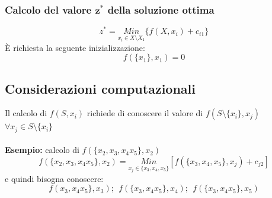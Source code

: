 \subsubsection{Calcolo del valore $\boldsymbol{z^{*}}$ della soluzione ottima}
\begin{equation}
	z^{*}=\underset{x_{i}\in X\setminus{X_{1}}}{Min}\{f(X,x_{i})+c_{i1}\}
\end{equation}
È richiesta la seguente inizializzazione:
\begin{equation}
	f(\{x_{1}\},x_{1})=0
\end{equation}
\subsection{Considerazioni computazionali}
Il calcolo di $f(S,x_{i})$ richiede di conoscere il valore di $f(S\setminus\{x_{i}\}, x_{j})$ $\forall x_{j}\in S\setminus\{x_{i}\}$\\\\
\textbf{Esempio:} calcolo di $f(\{x_{2},x_{3},x_{4}x_{5}\},x_{2})$
\begin{equation}
	f(\{x_{2},x_{3},x_{4}x_{5}\},x_{2})=\underset{x_{j}\in\{x_{3},x_{4},x_{5}\}}{Min}[f(\{x_{3},x_{4},x_{5}\},x_{j})+c_{j2}]
\end{equation}
e quindi bisogna conoscere:
\begin{equation}
	f(x_{3},x_{4}x_{5}\},x_{3});\ \ f(\{x_{3},x_{4}x_{5}\},x_{4});\ \ f(\{x_{3},x_{4}x_{5}\},x_{5})
\end{equation}

